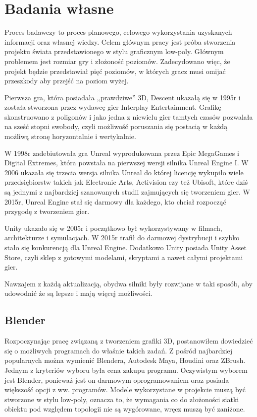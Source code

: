 \chapter{Badania własne}
\indent Proces badawczy to proces planowego, celowego wykorzystania uzyskanych informacji oraz własnej wiedzy. Celem głównym pracy jest próba stworzenia projektu świata przedstawionego w stylu graficznym low-poly. Głównym problemem jest rozmiar gry i złożoność poziomów. Zadecydowano więc, że projekt będzie przedstawiał pięć poziomów, w których gracz musi omijać przeszkody aby przejść na poziom wyżej.

\indent Pierwsza gra, która posiadała ,,prawdziwe'' 3D, Descent ukazałą się w 1995r i została stworzona przez wydawcę gier Interplay Entertainment. Grafikę skonstruowano z poligonów i jako jedna z niewielu gier tamtych czasów pozwalała na sześć stopni swobody, czyli możliwość poruszania się postacią w każdą możliwą stronę horyzontalnie i wertykalnie.

\indent W 1998r zadebiutowała gra Unreal wyprodukowana przez Epic MegaGames i Digital Extremes, która powstała na pierwszej wersji silnika Unreal Engine I. W 2006 ukazała się trzecia wersja silnika Unreal do której licencję wykupiło wiele przedsiębiorstw takich jak Electronic Arts, Activision czy też Ubisoft, które dziś są jednymi z najbardziej szanowanych studii zajmujących się tworzeniem gier. W 2015r, Unreal Engine stał się darmowy dla każdego, kto chciał rozpocząć przygodę z tworzeniem gier.

\indent Unity ukazało się w 2005r i początkowo był wykorzystywany w filmach, architekturze i symulacjach. W 2015r trafił do darmowej dystrybucji i szybko stało się konkurencją dla Unreal Engine. Dodatkowo Unity posiada Unity Asset Store, czyli sklep z gotowymi modelami, skryptami a nawet całymi projektami gier.

\indent Nawzajem z każdą aktualizacją, obydwa silniki były rozwijane w taki sposób, aby udowodnić że są lepsze i mają więcej możliwości.
\section{Blender}
\indent Rozpoczynając pracę związaną z tworzeniem grafiki 3D, postanowiłem dowiedzieć się o możliwych programach do właśnie takich zadań. Z pośród najbardziej popularnych można wymienić Blendera, Autodesk Maya, Houdini oraz ZBrush. Jednym z kryteriów wyboru była cena zakupu programu. Oczywistym wyborem jest Blender, ponieważ jest on darmowym oprogramowaniem oraz posiada większość opcji z ww. programów. Modele wykorzystane w projekcie muszą być stworzone w stylu low-poly, oznacza to, że wymagania co do złożoności siatki obiektu pod względem topologii nie są wygórowane, wręcz muszą być zaniżone. 
